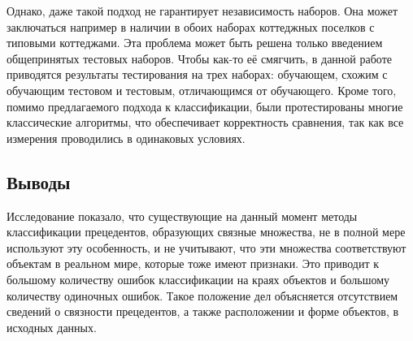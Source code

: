 Однако, даже такой подход не гарантирует независимость наборов. Она может заключаться например в наличии в обоих наборах коттеджных поселков с типовыми коттеджами. Эта проблема может быть решена только введением общепринятых тестовых наборов. Чтобы как-то её смягчить, в данной работе приводятся результаты тестирования на трех наборах: обучающем, схожим с обучающим тестовом и тестовым, отличающимся от обучающего. Кроме того, помимо предлагаемого подхода к классификации, были протестированы многие классические алгоритмы, что обеспечивает корректность сравнения, так как все измерения проводились в одинаковых условиях.

\subsection{Выводы}

Исследование показало, что существующие на данный момент методы классификации прецедентов, образующих связные множества, не в полной мере используют эту особенность, и не учитывают, что эти множества соответствуют объектам в реальном мире, которые тоже имеют признаки. Это приводит к большому количеству ошибок классификации на краях объектов и большому количеству одиночных ошибок. Такое положение дел объясняется отсутствием сведений о связности прецедентов, а также расположении и форме объектов, в исходных данных.